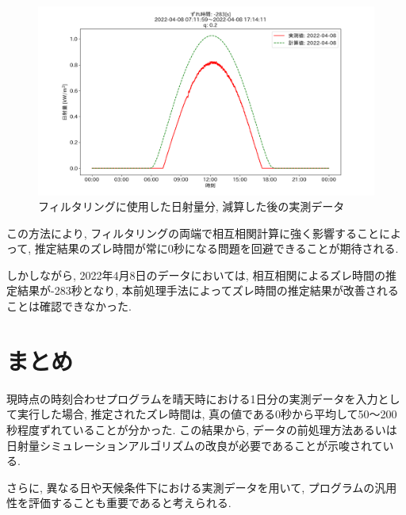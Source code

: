 \documentclass[a4j,12pt,]{jarticle}
\begin{document}
\begin{figure}[H]
  \begin{center}
    \includegraphics[width=160mm]{2022-04-08_mask_by_q_corr.png}
    \caption{フィルタリングに使用した日射量分, 減算した後の実測データ}
    \label{p10}
  \end{center}
\end{figure}

この方法により, フィルタリングの両端で相互相関計算に強く影響することによって, 推定結果のズレ時間が常に0秒になる問題を回避できることが期待される. 

しかしながら, 2022年4月8日のデータにおいては, 相互相関によるズレ時間の推定結果が-283秒となり, 本前処理手法によってズレ時間の推定結果が改善されることは確認できなかった. 

\section{まとめ}
現時点の時刻合わせプログラムを晴天時における1日分の実測データを入力として実行した場合, 推定されたズレ時間は, 真の値である0秒から平均して50〜200秒程度ずれていることが分かった. この結果から, データの前処理方法あるいは日射量シミュレーションアルゴリズムの改良が必要であることが示唆されている. 

さらに, 異なる日や天候条件下における実測データを用いて, プログラムの汎用性を評価することも重要であると考えられる. 
\end{document}
